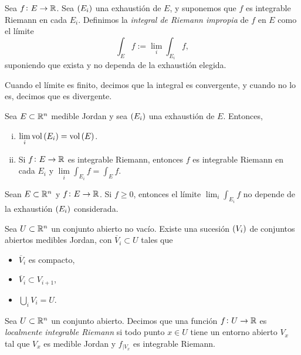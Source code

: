 \begin{defi}
    Sea $f \colon E \to \mathbb{R}$. Sea $\left( E_i \right)$ una exhaustión de $E$, y suponemos que $f$ es integrable Riemann en cada $E_i$. Definimos la \textit{integral de Riemann impropia} de $f$ en $E$ como el límite
    \[
        \int_E f := \lim\limits_i \int_{E_i} f,
    \]
    suponiendo que exista y no dependa de la exhaustión elegida.

    Cuando el límite es finito, decimos que la integral es convergente, y cuando no lo es, decimos que es divergente.
\end{defi}

\begin{prop}
    Sea $E \subset \mathbb{R}^n$ medible Jordan y sea $\left( E_i \right)$ una exhaustión de $E$. Entonces,
    \begin{enumerate}[(i)]
        \item $\lim\limits_i \operatorname{vol} \left( E_i \right) = \operatorname{vol} \left( E \right)$.
        \item Si $f \colon E \to \mathbb{R} $ es integrable Riemann, entonces $f$ es integrable Riemann en cada $E_i$ y $\lim\limits_i \int_{E_i} f = \int_E f$.
    \end{enumerate}
\end{prop}

\begin{prop}
    Sean $E \subset \mathbb{R}^n$ y $f \colon E \to \mathbb{R}$. Si $f\geq 0$, entonces el límite $\lim_i \int_{E_i} f$ no depende de la exhaustión $\left( E_i \right)$ considerada.
\end{prop}

\begin{lema}
    Sea $U \subset \mathbb{R}^n$ un conjunto abierto no vacío. Existe una sucesión $\left( V_i \right) $ de conjuntos abiertos medibles Jordan, con $\overline{V}_i \subset U$ tales que
    \begin{itemize}
        \item $\overline{V}_i$ es compacto,
        \item $\overline{V}_i \subset V_{i+1}$,
        \item $\bigcup\limits_i V_i = U$.
    \end{itemize}
\end{lema}

\begin{defi}
    Sea $U \subset \mathbb{R}^n$ un conjunto abierto. Decimos que una función $f \colon U \to \mathbb{R}$ es \textit{localmente integrable Riemann} si todo punto $x \in U$ tiene un entorno abierto $V_x$ tal que $V_x$ es medible Jordan y $f_{|V_x}$ es integrable Riemann.
\end{defi}


